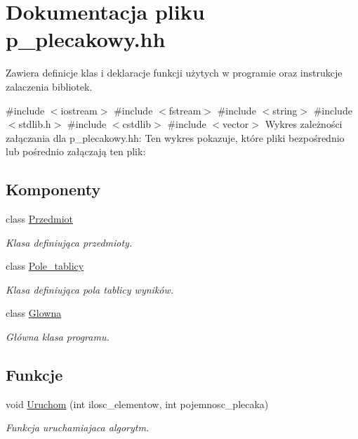 \hypertarget{p__plecakowy_8hh}{\section{\-Dokumentacja pliku p\-\_\-plecakowy.\-hh}
\label{p__plecakowy_8hh}
}


\-Zawiera definicje klas i deklaracje funkcji użytych w programie oraz instrukcje zalaczenia bibliotek.  


{\ttfamily \#include $<$iostream$>$}\*
{\ttfamily \#include $<$fstream$>$}\*
{\ttfamily \#include $<$string$>$}\*
{\ttfamily \#include $<$stdlib.\-h$>$}\*
{\ttfamily \#include $<$cstdlib$>$}\*
{\ttfamily \#include $<$vector$>$}\*
\-Wykres zależności załączania dla p\-\_\-plecakowy.\-hh\-:
\-Ten wykres pokazuje, które pliki bezpośrednio lub pośrednio załączają ten plik\-:
\subsection*{\-Komponenty}
\begin{DoxyCompactItemize}
\item 
class \hyperlink{class_przedmiot}{\-Przedmiot}
\begin{DoxyCompactList}\small\item\em \-Klasa definiująca przedmioty. \end{DoxyCompactList}\item 
class \hyperlink{class_pole__tablicy}{\-Pole\-\_\-tablicy}
\begin{DoxyCompactList}\small\item\em \-Klasa definiująca pola tablicy wyników. \end{DoxyCompactList}\item 
class \hyperlink{class_glowna}{\-Glowna}
\begin{DoxyCompactList}\small\item\em \-Główna klasa programu. \end{DoxyCompactList}\end{DoxyCompactItemize}
\subsection*{\-Funkcje}
\begin{DoxyCompactItemize}
\item 
void \hyperlink{p__plecakowy_8hh_a1ba8b3d77ab5e65ef5530d3e368570bf}{\-Uruchom} (int ilosc\-\_\-elementow, int pojemnosc\-\_\-plecaka)
\begin{DoxyCompactList}\small\item\em \-Funkcja uruchamiajaca algorytm. \end{DoxyCompactList}\end{DoxyCompactItemize}


